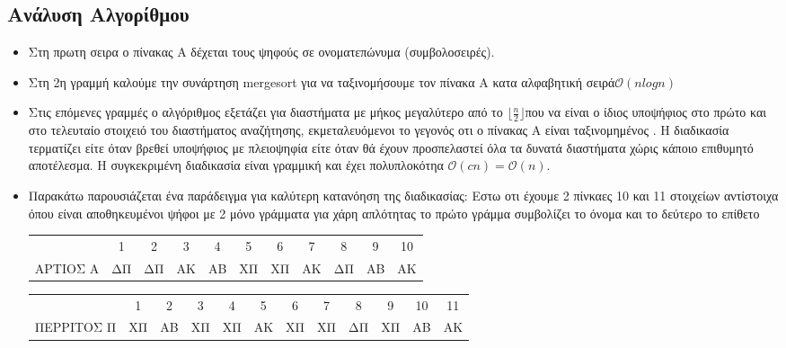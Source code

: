 \documentclass[a4paper]{article}
\begin{document}
\subsection*{Ανάλυση Αλγορίθμου}
\begin{itemize}



\item Στη πρωτη σειρα ο πίνακας Α δέχεται τους ψηφούς σε ονοματεπώνυμα (συμβολοσειρές).

    \item Στη 2η γραμμή καλούμε την συνάρτηση  mergesort για να ταξινομήσουμε τον πίνακα Α κατα αλφαβητική σειρά$\mathcal{O}(nlogn)$
    \item Στις επόμενες  γραμμές ο αλγόριθμος εξετάζει για διαστήματα με μήκος μεγαλύτερο από το $\lfloor\frac{n}{2}\rfloor$\footnotemark[7] που να είναι ο ίδιος υποψήφιος στο πρώτο και στο τελευταίο στοιχειό του διαστήματος αναζήτησης, εκμεταλευόμενοι  το γεγονός οτι ο πίνακας Α είναι ταξινομημένος . Η διαδικασία τερματίζει είτε όταν βρεθεί υποψήφιος με πλειοψηφία είτε όταν θά έχουν προσπελαστεί όλα τα δυνατά διαστήματα χώρις κάποιο επιθυμητό αποτέλεσμα. H συγκεκριμένη διαδικασία είναι γραμμική και  έχει πολυπλοκότηα $\mathcal{O}(cn)=\mathcal{O}(n)$.
      \item Παρακάτω παρουσιάζεται ένα παράδειγμα για καλύτερη κατανόηση της διαδικασίας:
    Εστω οτι έχουμε 2 πίνκαες 10 και 11 στοιχείων αντίστοιχα όπου είναι αποθηκευμένοι  ψήφοι με 2 μόνο γράμματα  για χάρη απλότητας  το πρώτο γράμμα συμβολίζει το όνομα και το δεύτερο  το επίθετο 

\begin{center}
\begin{tabular}{r|c|c|c|c|c|c|c|c|c|c|}
\multicolumn{1}{r}{} & \multicolumn{1}{c}{1} & \multicolumn{1}{c}{2} & \multicolumn{1}{c}{3} & \multicolumn{1}{c}{4} & \multicolumn{1}{c}{5} & \multicolumn{1}{c}{6} & \multicolumn{1}{c}{7} & \multicolumn{1}{c}{8} & \multicolumn{1}{c}{9} & \multicolumn{1}{c}{10}\\
\cline{2-11}
ΑΡΤΙΟΣ Α& ΔΠ & ΔΠ & ΑΚ & ΑΒ & ΧΠ & ΧΠ & ΑΚ & ΔΠ & ΑΒ & ΑΚ\\
\cline{2-11}
\end{tabular}
\begin{tabular}{r|c|c|c|c|c|c|c|c|c|c|c|}
\multicolumn{1}{r}{} & \multicolumn{1}{c}{1} & \multicolumn{1}{c}{2} & \multicolumn{1}{c}{3} & \multicolumn{1}{c}{4} & \multicolumn{1}{c}{5} & \multicolumn{1}{c}{6} & \multicolumn{1}{c}{7} & \multicolumn{1}{c}{8} & \multicolumn{1}{c}{9} & \multicolumn{1}{c}{10} & \multicolumn{1}{c}{11}\\
\cline{2-12}
ΠΕΡΡΙΤΟΣ Π& ΧΠ & ΑΒ & ΧΠ & ΧΠ & ΑΚ & ΧΠ & ΧΠ & ΔΠ & ΧΠ & ΑΒ & ΑΚ \\
\cline{2-12}
\end{tabular}
\end{center}


\end{itemize}
\end{document}
